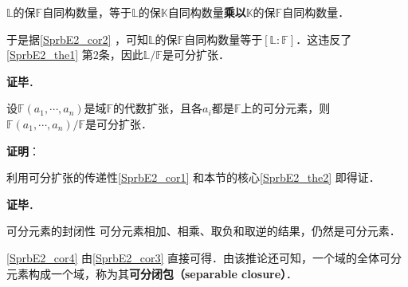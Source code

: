 $\mathbb{L}$的保$\mathbb{F}$自同构数量，等于$\mathbb{L}$的保$\mathbb{K}$自同构数量\textbf{乘以}$\mathbb{K}$的保$\mathbb{F}$自同构数量．

于是据\autoref{SprbE2_cor2} ，可知$\mathbb{L}$的保$\mathbb{F}$自同构数量等于$[\mathbb{L}:\mathbb{F}]$．这违反了\autoref{SprbE2_the1} 第$2$条，因此$\mathbb{L}/\mathbb{F}$是可分扩张．




\textbf{证毕}．





\begin{corollary}{}\label{SprbE2_cor3}
设$\mathbb{F}(a_1, \cdots, a_n)$是域$\mathbb{F}$的代数扩张，且各$a_i$都是$\mathbb{F}$上的可分元素，则$\mathbb{F}(a_1, \cdots, a_n)/\mathbb{F}$是可分扩张．
\end{corollary}

\textbf{证明}：

利用可分扩张的传递性\autoref{SprbE2_cor1} 和本节的核心\autoref{SprbE2_the2} 即得证．

\textbf{证毕}．





\begin{corollary}{可分元素的封闭性}\label{SprbE2_cor4}
可分元素相加、相乘、取负和取逆的结果，仍然是可分元素．
\end{corollary}

\autoref{SprbE2_cor4} 由\autoref{SprbE2_cor3} 直接可得．由该推论还可知，一个域的全体可分元素构成一个域，称为其\textbf{可分闭包（separable closure）}．











